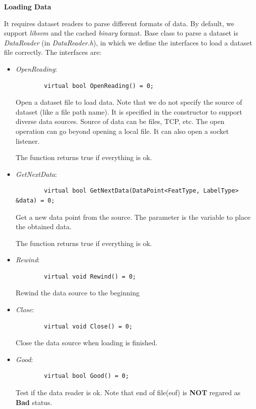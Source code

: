 \documentclass[11pt,a4paper]{article}
\newlength{\wideitemsep}
\let\olditem\item
\renewcommand{\item}{\setlength{\itemsep}{\wideitemsep}\olditem}
\begin{document}
\vspace{4mm}\hspace{-5mm}\textbf{Loading Data}
\vspace{2mm}

It requires dataset readers to parse different formats of data. By default, we
support \emph{libsvm} and the cached \emph{binary} format. Base class to parse
a dataset is \emph{DataReader} (in \emph{DataReader.h}), in which we define the
interfaces to load a dataset file correctly. The interfaces are:

\begin{itemize}
    \item \emph{OpenReading}:
        \lstset{language=C++,
            framexleftmargin=-1cm,
            xleftmargin=-1cm,
        }
        \begin{lstlisting}
        virtual bool OpenReading() = 0;
        \end{lstlisting}
        Open a dataset file to load data. Note that we do not specify the
        source of dataset (like a file path name). It is specified in the
        constructor to support diverse data sources. Source of data can be files, TCP, etc. The
        open operation can go beyond opening a local file. It can also open a
        socket listener.

        The function returns true if everything is ok.

    \item \emph{GetNextData}:
        \lstset{language=C++}
        \begin{lstlisting}
        virtual bool GetNextData(DataPoint<FeatType, LabelType> &data) = 0;
        \end{lstlisting}

        Get a new data point from the source. The parameter is the variable to place the obtained data.

        The function returns true if everything is ok.

    \item \emph{Rewind}:
        \lstset{language=C++}
        \begin{lstlisting}
        virtual void Rewind() = 0;
        \end{lstlisting}

        Rewind the data source to the beginning

    \item \emph{Close}:
        \lstset{language=C++}
        \begin{lstlisting}
        virtual void Close() = 0;
        \end{lstlisting}

        Close the data source when loading is finished.

    \item \emph{Good}:
        \lstset{language=C++}
        \begin{lstlisting}
        virtual bool Good() = 0;
        \end{lstlisting}

        Test if the data reader is ok. Note that end of file(eof) is
        \textbf{NOT} regared as \textbf{Bad} status.
\end{itemize}
\end{document}
